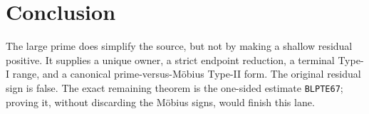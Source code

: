 \documentclass[11pt]{article}
\newcommand{\1}{\mathbf 1}
\begin{document}
\section{Conclusion}
The large prime does simplify the source, but not by making a shallow residual
positive.  It supplies a unique owner, a strict endpoint reduction, a terminal
Type-I range, and a canonical prime-versus-M\"obius Type-II form.  The original
residual sign is false.  The exact remaining theorem is the one-sided estimate
\texttt{BLPTE67}; proving it, without discarding the M\"obius signs, would finish
this lane.
\end{document}
